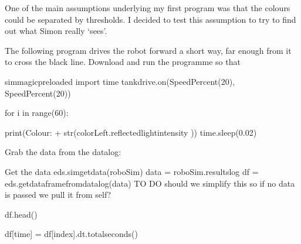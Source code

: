 \documentclass[letterpaper,10pt,english]{sphinxmanual}
\begin{document}
{One of the main assumptions underlying my first program was that the colours could be separated by thresholds. I decided to test this assumption to try to find out what Simon really ‘sees’.

The following program drives the robot forward a short way, far enough from it to cross the black line. Download and run the programme so that

{
\begin{sphinxVerbatim}[commandchars=\\\{\}]
\llap{\color{nbsphinxin}[ ]:\,\hspace{\fboxrule}\hspace{\fboxsep}}\PYGZpc{}\PYGZpc{}sim\PYGZus{}magic\PYGZus{}preloaded
import time
tank\PYGZus{}drive.on(SpeedPercent(20), SpeedPercent(20))

for i in range(60):

    print(\PYGZsq{}Colour: \PYGZsq{} + str(colorLeft.reflected\PYGZus{}light\PYGZus{}intensity ))
    time.sleep(0.02)
\end{sphinxVerbatim}
}

Grab the data from the datalog:

{
\begin{sphinxVerbatim}[commandchars=\\\{\}]
\llap{\color{nbsphinxin}[ ]:\,\hspace{\fboxrule}\hspace{\fboxsep}}\PYGZsh{} Get the data
\PYGZsh{}eds.sim\PYGZus{}get\PYGZus{}data(roboSim)
data = roboSim.results\PYGZus{}log
df = eds.get\PYGZus{}dataframe\PYGZus{}from\PYGZus{}datalog(data)
\PYGZsh{} TO DO \PYGZhy{} should we simplify this so if no data is passed we pull it from self?

df.head()
\end{sphinxVerbatim}
}

{
\begin{sphinxVerbatim}[commandchars=\\\{\}]
\llap{\color{nbsphinxin}[ ]:\,\hspace{\fboxrule}\hspace{\fboxsep}}df[\PYGZsq{}time\PYGZsq{}] = df[\PYGZsq{}index\PYGZsq{}].dt.total\PYGZus{}seconds()
\end{sphinxVerbatim}
}

}
\end{document}
